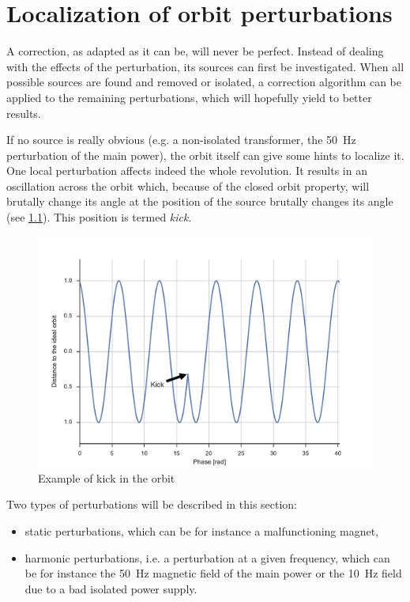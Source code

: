 
\chapter{Localization of orbit perturbations}
\label{sec:localization}

 A correction, as adapted as it can be, will never be perfect. Instead of dealing with the effects of the perturbation, its sources can first be investigated. When all possible sources are found and removed or isolated, a correction algorithm can be applied to the remaining perturbations, which will hopefully yield to better results.

 If no source is really obvious (e.g. a non-isolated transformer, the \SI{50}{\hertz} perturbation of the main power), the orbit itself can give some hints to localize it. One local perturbation affects indeed the whole revolution. It results in an oscillation across the orbit which, because of the closed orbit property, will brutally change its angle at the position of the source  brutally changes its angle (see \cref{fig:kick}). This position is termed \textit{kick}.

\begin{figure}[!h]
	\centering
	\includegraphics[width=.9\linewidth]{img/kick}
	\caption{\label{fig:kick}Example of kick in the orbit}
\end{figure}

Two types of perturbations will be described in this section:
\begin{itemize}
	\item static perturbations, which can be  for instance a malfunctioning magnet,
	\item harmonic perturbations, i.e. a perturbation at a given frequency, which can be for instance the \SI{50}{Hz} magnetic field of the main power or the \SI{10}{Hz} field due to a bad isolated power supply.
\end{itemize}

